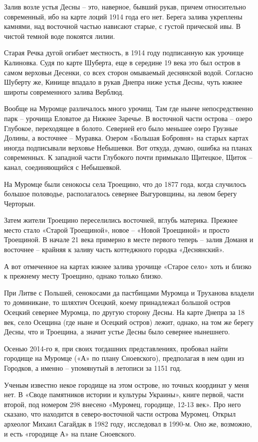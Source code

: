 Залив возле устья Десны – это, наверное, бывший рукав, причем относительно современный, ибо на карте лоций 1914 года его нет. Берега залива укреплены камнями, над восточной частью нависают старые, с густой прической ивы. В чистой темной воде покоятся лилии.

Старая Речка дугой огибает местность, в 1914 году подписанную как урочище Калиновка. Судя по карте Шуберта, еще в середине 19 века это был остров в самом верховьи Десенки, со всех сторон омываемый деснянской водой. Согласно Шуберту же, Кинище впадало в рукав Днепра ниже устья Десны, чуть южнее широты современного залива Верблюд.

Вообще на Муромце различалось много урочищ. Там где нынче непосредственно парк – урочища Еловатое да Нижнее Заречье. В восточной части острова – озеро Глубокое, переходящее в болото. Северней его было меньшее озеро Грузные Долины, а восточнее – Муравка. Озером «Большая Бобровня» на старых картах иногда подписывали верховье Небышевки. Вот откуда, думаю, ошибка на планах современных. К западной части Глубокого почти примыкало Щитецкое, Щиток – канал, соединяющийся с Небышевкой.

На Муромце были сенокосы села Троещино, что до 1877 года, когда случилось большое половодье, располагалось севернее Выгуровщины, на левом берегу Черторыи.

Затем жители Троещино переселились восточней, вглубь материка. Прежнее место стало «Старой Троещиной», новое – «Новой Троещиной» и просто Троещиной. В начале 21 века примерно в месте первого теперь – залив Доманя и восточнее – крайняя к заливу часть коттеджного городка «Деснянский».

А вот отмеченное на картах южнее залива урочище «Старое село» хоть и близко к прежнему месту Троещино, однако только близко.

При Литве с Польшей, сенокосами да пастбищами Муромца и Труханова владели то доминикане, то шляхтич Осецкий, коему принадлежал большой остров Осецкий севернее Муромца, по другую сторону Десны. На карте Днепра за 18 век, село Осещина (где ныне и Осецкий остров) лежит, однако, на том же берегу Десны, что и Троещина, а значит устье Десны было севернее нынешнего.

Осенью 2014-го я, при своих тогдашних представлениях, пробовал найти городище на Муромце («А» по плану Сноевского), предполагая в нем один из Городков, а именно – упомянутый в летописи за 1151 год.

Ученым известно некое городище на этом острове, но точных координат у меня нет. В «Своде памятников истории и культуры Украины», книге первой, части второй, под номером 298 внесено «Муромец, городище, 12-13 век». Про него сказано, что находится в северо-восточной части острова Муромец. Открыл археолог Михаил Сагайдак в 1982 году, исследовал в 1990-м. Оно же, возможно, и есть «городище А» на плане Сноевского.

